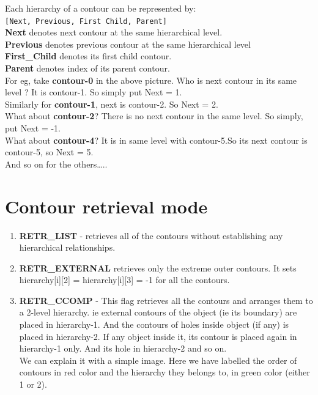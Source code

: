 \documentclass[]{article}
\providecommand{\tightlist}{%
  \setlength{\itemsep}{0pt}\setlength{\parskip}{0pt}}
\begin{document}
Each hierarchy of a contour can be represented by:\\
\texttt{{[}Next,\ Previous,\ First\ Child,\ Parent{]}}\\
\textbf{Next} denotes next contour at the same hierarchical level.\\
\textbf{Previous} denotes previous contour at the same hierarchical
level\\
\textbf{First\_Child} denotes its first child contour.\\
\textbf{Parent} denotes index of its parent contour.\\
For eg, take \textbf{contour-0} in the above picture. Who is next
contour in its same level ? It is contour-1. So simply put Next = 1.\\
Similarly for \textbf{contour-1}, next is contour-2. So Next = 2.\\
What about \textbf{contour-2}? There is no next contour in the same
level. So simply, put Next = -1.\\
What about \textbf{contour-4}? It is in same level with contour-5.So its
next contour is contour-5, so Next = 5.\\
And so on for the others\ldots{}..

\section{Contour retrieval mode}\label{contour-retrieval-mode}

\begin{enumerate}
\def\labelenumi{\arabic{enumi}.}
\tightlist
\item
  \textbf{RETR\_LIST} - retrieves all of the contours without
  establishing any hierarchical relationships.\\
\item
  \textbf{RETR\_EXTERNAL} retrieves only the extreme outer contours. It
  sets hierarchy{[}i{]}{[}2{]} = hierarchy{[}i{]}{[}3{]} = -1 for all
  the contours.\\
\item
  \textbf{RETR\_CCOMP} - This flag retrieves all the contours and
  arranges them to a 2-level hierarchy. ie external contours of the
  object (ie its boundary) are placed in hierarchy-1. And the contours
  of holes inside object (if any) is placed in hierarchy-2. If any
  object inside it, its contour is placed again in hierarchy-1 only. And
  its hole in hierarchy-2 and so on.\\
  We can explain it with a simple image. Here we have labelled the order
  of contours in red color and the hierarchy they belongs to, in green
  color (either 1 or 2).
\end{enumerate}
\end{document}
